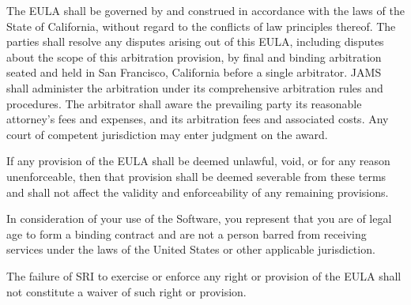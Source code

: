 \documentclass[11pt,twoside,fleqn,openright,titlepage]{cslreport}
\begin{document}
\begin{small}
The EULA  shall be  governed by and  construed in accordance  with the
laws of  the State of California,  without regard to  the conflicts of
law principles thereof. The parties shall resolve any disputes arising
out  of  this  EULA,  including  disputes  about  the  scope  of  this
arbitration  provision, by  final and  binding arbitration  seated and
held  in San Francisco,  California before  a single  arbitrator. JAMS
shall administer  the arbitration under  its comprehensive arbitration
rules and procedures.  The arbitrator shall aware the prevailing party
its reasonable attorney's fees  and expenses, and its arbitration fees
and associated  costs.  Any court of competent  jurisdiction may enter
judgment on the award.

If any  provision of the EULA  shall be deemed unlawful,  void, or for
any  reason  unenforceable,  then   that  provision  shall  be  deemed
severable  from these  terms and  shall  not affect  the validity  and
enforceability of any remaining provisions.

In consideration of  your use of the Software,  you represent that you
are  of legal age  to form  a binding  contract and  are not  a person
barred from receiving services under  the laws of the United States or
other applicable jurisdiction.

The failure  of SRI to exercise  or enforce any right  or provision of
the EULA shall not constitute a waiver of such right or provision.
\end{small}

\newpage


\end{document}
